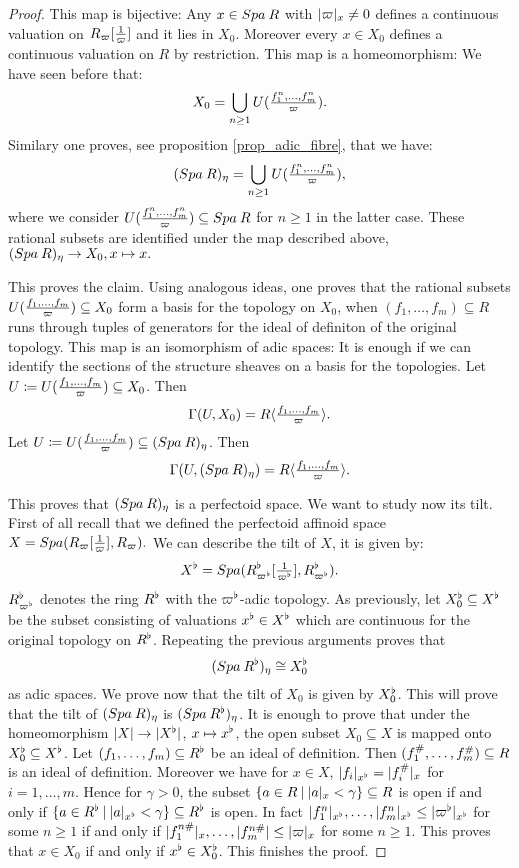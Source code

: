 \begin{proof}
This map is bijective: Any $x\in{Spa{\:R}}$ with $\lvert\varpi\rvert_{x}\neq0$ defines a continuous valuation on $R_{\varpi}[\tfrac{1}{\varpi}]$ and it lies in $X_0$. Moreover every $x\in X_0$ defines a continuous valuation on $R$ by restriction. This map is a homeomorphism: We have seen before that:
\[X_0 =  \bigcup\limits_{n\geq1}U(\tfrac{f_1^n,\dots,f_m^n}{\varpi}).\]
Similary one proves, see proposition \ref{prop_adic_fibre}, that we have:
\[({Spa{\:R}})_{\eta} =  \bigcup\limits_{n\geq1}U(\tfrac{f_1^n,\dots,f_m^n}{\varpi}),\]
where we consider $U(\tfrac{f_1^n,\dots,f_m^n}{\varpi})\subseteq {Spa{\:R}}$  for $n\geq1$ in the latter case.
These rational subsets are identified under the map described above, $({Spa{\:R}})_{\eta}\to X_0, x\mapsto x.$

This proves the claim. Using analogous ideas, one proves that  the rational subsets 
$U(\tfrac{f_1,\dots,f_m}{\varpi})\subseteq X_0$  form a basis for the topology on $X_0$, when $(f_1,\dots,f_m)\subseteq R$ runs through tuples of generators for the ideal of definiton of the original topology.
This map is an isomorphism of adic spaces: It is enough if we can identify the sections of the structure sheaves on a basis for the topologies.
Let $U\coloneqq U(\tfrac{f_1,\dots,f_m}{\varpi})\subseteq X_0$. Then
\[\Gamma(U,X_0) = R\langle \tfrac{f_1,\dots,f_m}{\varpi}\rangle.\]
Let $U\coloneqq U(\tfrac{f_1,\dots,f_m}{\varpi})\subseteq ({Spa{\:R}})_{\eta}$. Then
\[\Gamma(U, ({Spa{\:R}})_{\eta}) = R\langle \tfrac{f_1,\dots,f_m}{\varpi}\rangle.\]

This proves that  $({Spa{\:R}})_{\eta}$ is a perfectoid space.
We want to study now its tilt.
First of all recall that we defined the perfectoid affinoid space $X={Spa({R_{\varpi}[\tfrac{1}{\varpi}]},{ R_{\varpi}})}.$
We can describe the tilt of $X$, it is given by:
\[X^{\flat} = {Spa({R^{\flat}_{\varpi^{\flat}}[\tfrac{1}{\varpi^{\flat}}]},{R^{\flat}_{\varpi^{\flat}}})}.\]
$R^{\flat}_{\varpi^{\flat}}$ denotes the ring $R^{\flat}$ with the $\varpi^{\flat}$-adic topology.
As previously, let $X^{\flat}_0\subseteq X^{\flat}$ be the subset consisting of valuations $x^{\flat}\in X^{\flat}$ which are continuous for the original topology on $R^{\flat}$.
Repeating the previous arguments proves that
\[({Spa{\:R^{\flat}}})_{\eta}\cong X^{\flat}_0\]
as adic spaces.
We prove now that the tilt of $X_0$ is given by $X^{\flat}_0$.
This will prove that the tilt of $({Spa{\:R}})_{\eta}$ is $({Spa{\:R^{\flat}}})_{\eta}$.
It is enough to prove that under the homeomorphism $\lvert X\rvert\to\lvert X^{\flat}\rvert$, $x\mapsto x^{\flat}$,
the open subset $X_0\subseteq X$ is mapped onto $X^{\flat}_0\subseteq X^{\flat}$.
Let $(f_1,\dots, f_m)\subseteq R^{\flat}$ be an ideal of definition.
Then  $(f^{\#}_1,\dots, f^{\#}_m)\subseteq R$ is an ideal of definition.
Moreover we have for $x\in X$, $\lvert f_i\rvert_{x^{\flat}} = \lvert f^{\#}_i\rvert_{x}$ for $i=1,\dots, m$.
Hence for $\gamma>0$, the subset $\{a\in R\:\vert\: \lvert a\rvert_{x}<\gamma\}\subseteq R$ is open 
if and only if
$\{a\in R^{\flat}\:\vert\:\lvert a\rvert_{x^{\flat}}<\gamma\}\subseteq R^{\flat}$ is open.
In fact $\lvert f_1^n\rvert_{x^{\flat}},\dots, \lvert f_m^n\rvert_{x^{\flat}}\leq\lvert\varpi^{\flat}\rvert_{x^{\flat}}$ for some $n\geq1$ if and only if
$\lvert f^{n\#}_1\rvert_{x},\dots, \lvert f^{n\#}_m\rvert\leq\lvert\varpi\rvert_{x}$ for some $n\geq1$.
This proves that $x\in X_0$ if and only if $x^{\flat}\in X^{\flat}_0$. This finishes the proof.
\end{proof}
